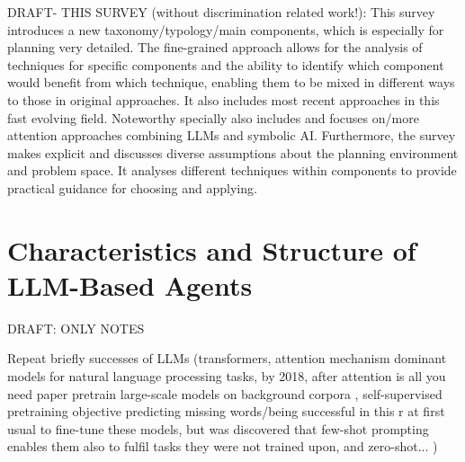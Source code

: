 \documentclass{article}
\begin{document}



DRAFT- THIS SURVEY (without discrimination related work!): 
This survey introduces a new taxonomy/typology/main components, which is especially  for planning very detailed. 
The fine-grained approach allows for the analysis of techniques for specific components and the ability to identify which component would benefit from which technique, enabling them to be mixed in different ways to those in original approaches. 
It also includes most recent approaches in this fast evolving field. Noteworthy specially also includes and focuses on/more attention approaches combining LLMs and symbolic AI. Furthermore, the survey makes explicit and discusses diverse assumptions about the planning environment and problem space. It analyses different techniques within components to provide practical guidance for choosing and applying.




\section{Characteristics and Structure of LLM-Based Agents}
DRAFT: ONLY NOTES

Repeat briefly successes of LLMs
(transformers, attention mechanism
dominant models for natural language processing tasks, by 2018, after attention is all you need paper
pretrain large-scale models on background corpora , self-supervised pretraining objective
predicting missing words/being successful in this r
at first usual to fine-tune these models, but was discovered that few-shot prompting enables them also to fulfil tasks they were not trained upon, and zero-shot... )
\end{document}
